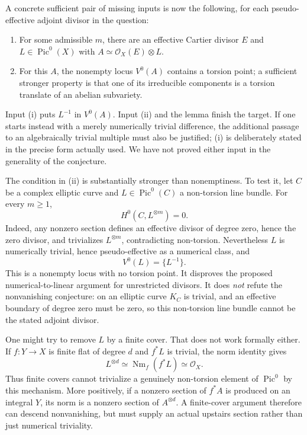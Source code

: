 \documentclass[11pt,a4paper]{article}
\numberwithin{equation}{section}
\begin{document}
A concrete sufficient pair of missing inputs is now the following, for each pseudo-effective adjoint divisor in the question:
\begin{enumerate}[label=(\roman*),leftmargin=2.5em]
\item For some admissible $m$, there are an effective Cartier divisor $E$ and $L\in\operatorname{Pic}^0(X)$ with $A\simeq\mathcal O_X(E)\otimes L$.
\item For this $A$, the nonempty locus $V^0(A)$ contains a torsion point; a sufficient stronger property is that one of its irreducible components is a torsion translate of an abelian subvariety.
\end{enumerate}
Input (i) puts $L^{-1}$ in $V^0(A)$. Input (ii) and the lemma finish the target. If one starts instead with a merely numerically trivial difference, the additional passage to an algebraically trivial multiple must also be justified; (i) is deliberately stated in the precise form actually used. We have not proved either input in the generality of the conjecture.

The condition in (ii) is substantially stronger than nonemptiness. To test it, let $C$ be a complex elliptic curve and $L\in\operatorname{Pic}^0(C)$ a non-torsion line bundle. For every $m\ge1$,
\begin{equation}\label{eq194:elliptic}
 H^0(C,L^{\otimes m})=0.
\end{equation}
Indeed, any nonzero section defines an effective divisor of degree zero, hence the zero divisor, and trivializes $L^{\otimes m}$, contradicting non-torsion. Nevertheless $L$ is numerically trivial, hence pseudo-effective as a numerical class, and
\[
 V^0(L)=\{L^{-1}\}.
\]
This is a nonempty locus with no torsion point. It disproves the proposed numerical-to-linear argument for unrestricted divisors. It does \emph{not} refute the nonvanishing conjecture: on an elliptic curve $K_C$ is trivial, and an effective boundary of degree zero must be zero, so this non-torsion line bundle cannot be the stated adjoint divisor.

One might try to remove $L$ by a finite cover. That does not work formally either. If $f:Y\to X$ is finite flat of degree $d$ and $f^*L$ is trivial, the norm identity gives
\[
 L^{\otimes d}\simeq\operatorname{Nm}_f(f^*L)\simeq\mathcal O_X.
\]
Thus finite covers cannot trivialize a genuinely non-torsion element of $\operatorname{Pic}^0$ by this mechanism. More positively, if a nonzero section of $f^*A$ is produced on an integral $Y$, its norm is a nonzero section of $A^{\otimes d}$. A finite-cover argument therefore can descend nonvanishing, but must supply an actual upstairs section rather than just numerical triviality.
\end{document}
